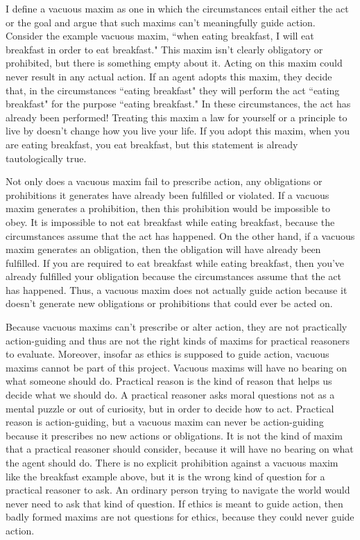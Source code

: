 \begin{isabellebody}
\begin{isamarkuptext}
I define a vacuous maxim as one in which the circumstances entail either the act or the goal and argue 
that such maxims can't meaningfully guide action. Consider the example vacuous maxim, ``when eating 
breakfast, I will eat breakfast in order to eat breakfast." This 
maxim isn't clearly obligatory or prohibited, but there is something empty about it. Acting on this
 maxim could never result in any actual action. If an agent adopts this maxim, 
they decide that, in the circumstances ``eating breakfast" they will perform the act ``eating breakfast"
for the purpose ``eating breakfast." In these circumstances, the act has 
already been performed! Treating this maxim a law for yourself or a principle to live by doesn't change 
how you live your life. If you adopt this maxim, when you are eating breakfast, you eat breakfast, 
but this statement is already tautologically true. 

Not only does a vacuous maxim fail to prescribe action, any obligations or prohibitions it 
generates have already been fulfilled or violated. If a vacuous 
maxim generates a prohibition, then this prohibition would be impossible to obey. 
It is impossible to not eat breakfast while eating breakfast, because the circumstances assume that the 
act has happened. On the other hand, if a vacuous maxim generates an obligation, then the obligation 
will have already been fulfilled. If you are required to eat breakfast while eating breakfast, then you've 
already fulfilled your obligation because the circumstances assume that the act has happened. Thus, 
a vacuous maxim does not actually guide action because it doesn't generate new obligations or 
prohibitions that could ever be acted on. 

Because vacuous maxims can't prescribe or alter action, they are not practically action-guiding and 
thus are not the right kinds of maxims for practical reasoners to evaluate. Moreover, insofar as ethics 
is supposed to guide action, vacuous maxims cannot be part of this project. Vacuous maxims
will have no bearing on what someone should do. Practical reason
is the kind of reason that helps us decide what we should do. 
A practical reasoner asks moral questions not as a mental puzzle or out of curiosity, but 
in order to decide how to act. Practical reason is action-guiding, but a vacuous
 maxim can never be action-guiding because it prescribes no new
actions or obligations. It is not the kind of maxim that a practical reasoner should consider, because it
will have no bearing on what the agent should do. 
There is no explicit prohibition against a vacuous maxim like the breakfast example above, but it 
is the wrong kind of question for a practical reasoner to ask. An ordinary person trying 
to navigate the world would never need to ask that kind of question. If ethics is meant 
to guide action, then badly formed maxims are not questions for ethics, because they could never guide 
action.


\end{isamarkuptext}
\end{isabellebody}

